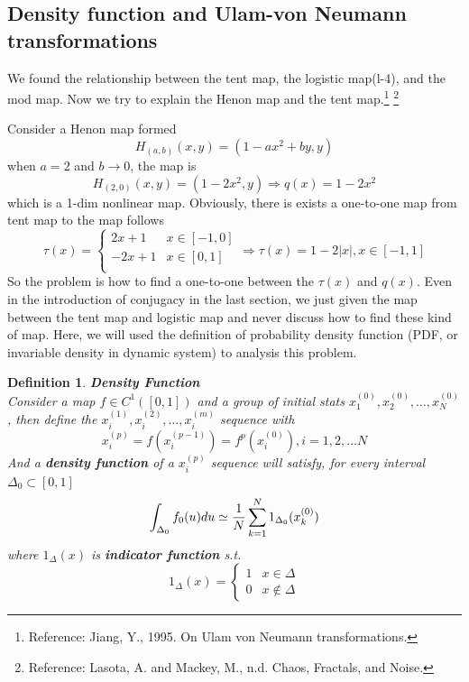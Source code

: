 \documentclass[12pt]{article}
\theoremstyle{plain}
\newtheorem{definition}{{\color{red}\textbf{Definition}}}[section]
\begin{document}
\subsection{Density function and Ulam-von Neumann transformations}

We found the relationship between the tent map, the logistic map(l-4), and the mod map. Now we try to explain the Henon map and the tent map.\footnote{Reference: Jiang, Y., 1995. On Ulam von Neumann transformations.} \footnote{Reference: Lasota, A. and Mackey, M., n.d. Chaos, Fractals, and Noise.}

Consider a Henon map formed 
$$
H_{(a,b)}(x, y) = (1 - ax^2 + by, y)
$$
when $a = 2$ and $b \rightarrow 0$, the map is 
$$
H_{(2, 0)}(x, y) = (1 - 2x^2, y) \Rightarrow q(x) = 1 - 2x^2
$$
which is a 1-dim nonlinear map. Obviously, there is exists a one-to-one map from tent map to the map follows 
$$
\tau(x) = \left\{\begin{array}{ll}
2x + 1  & x \in [-1, 0] \\
-2x + 1 & x \in [0, 1] \\
\end{array}\right. \Rightarrow \tau(x) = 1 - 2|x|, x \in [-1, 1]
$$
So the problem is how to find a one-to-one between the $\tau(x)$ and $q(x)$. Even in the introduction of conjugacy in the last section, we just given the map between the tent map and logistic map and never discuss how to find these kind of map. Here, we will used the definition of probability density function (PDF, or invariable density in dynamic system) to analysis this problem.




\begin{definition}\textbf{Density Function}
\\\noindent Consider a map $f \in C^1([0, 1])$ and a group of initial stats $x_1^{(0)}, x_2^{(0)}, \ldots, x_N^{(0)}$, then define the $x_i^{(1)}, x_i^{(2)}, \ldots, x_i^{(m)}$ sequence with 
$$
x_i^{(p)} = f(x_i^{(p-1)}) = f^p(x_i^{(0)}), i = 1, 2, \ldots N
$$
And a \textbf{density function} of a $x_i^{(p)}$ sequence will satisfy, for every interval $\Delta_0 \subset [0, 1]$
$$
\int_{\Delta_0}f_0(u) du \simeq{1\over N} \sum_{k = 1}^{N}1_{\Delta_0}(x_k^{(0)})
$$
where $1_{\Delta}(x)$ is \textbf{indicator function} s.t. 
$$
1_{\Delta}(x) =\left\{\begin{array}{ll}
1 & x \in \Delta \\
0 & x \notin \Delta
\end{array}
\right.
$$
\end{definition}
\end{document}
